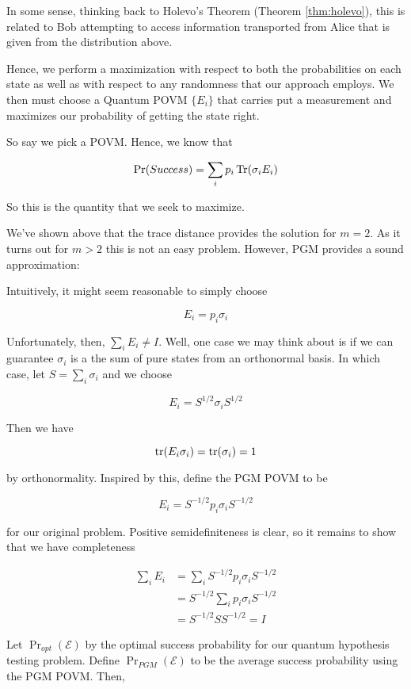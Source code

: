 \documentclass[main.tex]{subfiles}
\begin{document}
{\begin{subappendices}
In some sense, thinking back to Holevo's Theorem (Theorem \ref{thm:holevo}), this is related to Bob attempting to access information transported from Alice that is given from the distribution above.

Hence, we perform a maximization with respect to both the probabilities on each state as well as with respect to any randomness that our approach employs. We then must choose a Quantum POVM $\{E_i\}$ that carries put a measurement and maximizes our probability of getting the state right.

So say we pick a POVM. Hence, we know that

\begin{align*}
\Pr(Success)= \sum_i p_i \Tr (\sigma_i E_i)
\end{align*}


So this is the quantity that we seek to maximize. 

We've shown above that the trace distance provides the solution for $m=2$. As it turns out for $m>2$ this is not an easy problem. However, PGM provides a sound approximation:

Intuitively, it might seem reasonable to simply choose 

$$E_i = p_i \sigma_i$$

Unfortunately, then, $\sum_i E_i \neq I$. Well, one case we may think about is if we can guarantee $\sigma_i$ is a the sum of pure states from an orthonormal basis. In which case, let $S = \sum_i \sigma_i$ and we choose 

$$E_i = S^{1/2} \sigma_i S^{1/2} $$ 

Then we have

$$
\tr(E_i \sigma_i) = \tr(\sigma_i) = 1
$$

by orthonormality. Inspired by this, define the PGM POVM to be 

$$E_i = S^{-1/2}p_i \sigma_i S^{-1/2}$$ 

for our original problem. Positive semidefiniteness is clear, so it remains to show that we have completeness

\begin{align*}
\sum_i E_i &= \sum_i S^{-1/2}p_i \sigma_i S^{-1/2}\\
&=  S^{-1/2} \sum_i p_i \sigma_i S^{-1/2} \\
&= S^{-1/2} S S^{-1/2} = I
\end{align*}

\begin{theorem}
Let $\Pr_{opt}(\mathcal{E})$ by the optimal success probability for our 	quantum hypothesis testing problem. Define $\Pr_{PGM}(\mathcal{E})$ to be the average success probability using the PGM POVM. Then,


\end{theorem}
\end{subappendices}}
\end{document}
